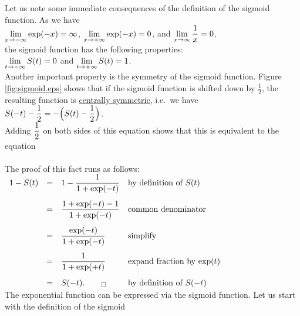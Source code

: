 \noindent
Let us note some immediate consequences of the definition of the sigmoid function.  As we have
\\[0.2cm]
\hspace*{1.3cm}
$\displaystyle\lim\limits_{x\rightarrow-\infty} \exp(-x) = \infty$, \quad 
$\displaystyle\lim\limits_{x\rightarrow+\infty} \exp(-x) = 0$, \quad and \quad
$\displaystyle\lim\limits_{x\rightarrow\infty} \frac{1}{x} = 0$, 
\\[0.2cm]
the sigmoid function has the following properties:
\\[0.2cm]
\hspace*{1.3cm}
$\displaystyle \lim_{t\rightarrow-\infty} S(t) = 0$ \quad and \quad
$\displaystyle \lim_{t\rightarrow+\infty} S(t) = 1$.
\\[0.2cm]
Another important property is the symmetry of the sigmoid function.  Figure \ref{fig:sigmoid.eps} shows that if the
sigmoid function is shifted down by $\frac{1}{2}$, the resulting function is 
\href{https://en.wikipedia.org/wiki/Point_reflection}{centrally symmetric}, i.e.~we have
\\[0.2cm]
\hspace*{1.3cm}
$\displaystyle S(-t) - \frac{1}{2} = -\Bigl(S(t) - \frac{1}{2}\Bigr)$.
\\[0.2cm]
Adding $\displaystyle\frac{1}{2}$ on both sides of this equation shows that this is equivalent to the equation
\\[0.2cm]
\hspace*{1.3cm}
\colorbox{red}{}
\\[0.2cm]
The proof of this fact runs as follows:
\\[0.2cm]
\hspace*{1.3cm}
$
\begin{array}{lcll}
1 - S(t) & = & \displaystyle 1 - \frac{1}{1 + \exp(-t)}             & \mbox{by definition of $S(t)$}           \\[0.5cm]
         & = & \displaystyle \frac{1 + \exp(-t) - 1}{1 + \exp(-t)}  & \mbox{common denominator}                \\[0.5cm]
         & = & \displaystyle \frac{\exp(-t)}{1 + \exp(-t)}          & \mbox{simplify}                          \\[0.5cm]
         & = & \displaystyle \frac{1}{1 + \exp(+t)}                 & \mbox{expand fraction by $\exp(t)$}      \\[0.5cm]
         & = & S(-t). \qquad _\Box                         & \mbox{by definition of $S(-t)$}
\end{array}
$
\\[0.2cm]
The exponential function can be expressed via the sigmoid function.  Let us start with the definition of the sigmoid
